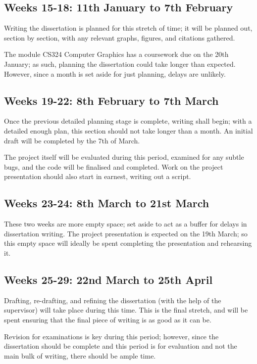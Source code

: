 \documentclass[12pt, a4paper]{scrartcl}
\begin{document}
\subsection{Weeks 15-18: 11th January to 7th February}

Writing the dissertation is planned for this stretch of time; it will be planned out, section by section, with any relevant graphs, figures, and citations gathered.

The module CS324 Computer Graphics has a coursework due on the 20th January; as such, planning the dissertation could take longer than expected. However, since a month is set aside for just planning, delays are unlikely.

\subsection{Weeks 19-22: 8th February to 7th March}

Once the previous detailed planning stage is complete, writing shall begin; with a detailed enough plan, this section should not take longer than a month. An initial draft will be completed by the 7th of March.

The project itself will be evaluated during this period, examined for any subtle bugs, and the code will be finalised and completed. Work on the project presentation should also start in earnest, writing out a script.

\subsection{Weeks 23-24: 8th March to 21st March}

These two weeks are more empty space; set aside to act as a buffer for delays in dissertation writing. The project presentation is expected on the 19th March; so this empty space will ideally be spent completing the presentation and rehearsing it.

\subsection{Weeks 25-29: 22nd March to 25th April}

Drafting, re-drafting, and refining the dissertation (with the help of the supervisor) will take place during this time. This is the final stretch, and will be spent ensuring that the final piece of writing is as good as it can be.

Revision for examinations is key during this period; however, since the dissertation should be complete and this period is for evaluation and not the main bulk of writing, there should be ample time.
\end{document}
